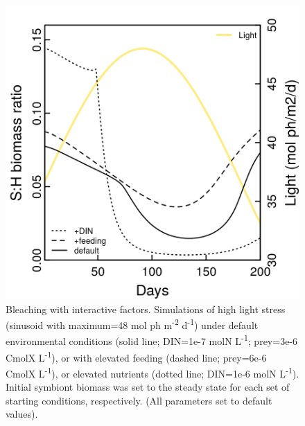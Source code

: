 \documentclass[]{elsarticle} %
\makeatletter
\def\maxwidth{\ifdim\Gin@nat@width>\linewidth\linewidth
\else\Gin@nat@width\fi}
\let\Oldincludegraphics\includegraphics
\renewcommand{\includegraphics}[1]{\Oldincludegraphics[width=\maxwidth]{#1}}
\makeatother
\begin{document}
\begin{figure}[htbp]
\centering
\includegraphics{../img/Fig7.png}
\caption{Bleaching with interactive factors. Simulations of high light
stress (sinusoid with maximum=48 mol ph m\textsuperscript{-2}
d\textsuperscript{-1}) under default environmental conditions (solid
line; DIN=1e-7 molN L\textsuperscript{-1}; prey=3e-6 CmolX
L\textsuperscript{-1}), or with elevated feeding (dashed line; prey=6e-6
CmolX L\textsuperscript{-1}), or elevated nutrients (dotted line;
DIN=1e-6 molN L\textsuperscript{-1}). Initial symbiont biomass was set
to the steady state for each set of starting conditions, respectively.
(All parameters set to default values).}
\end{figure}
\end{document}
